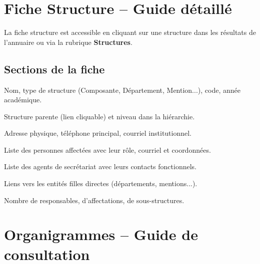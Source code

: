 
\section{Fiche Structure -- Guide d\'etaill\'e}
\label{sec:fiche_structure}

La fiche structure est accessible en cliquant sur une structure dans les r\'esultats de l'annuaire ou via la rubrique \textbf{Structures}.

\subsection{Sections de la fiche}

\begin{description}[style=nextline, font=\bfseries]
  \item[Identification] Nom, type de structure (Composante, D\'epartement, Mention...), code, ann\'ee acad\'emique.
  \item[Hi\'erarchie] Structure parente (lien cliquable) et niveau dans la hi\'erarchie.
  \item[Coordonn\'ees] Adresse physique, t\'el\'ephone principal, courriel institutionnel.
  \item[Responsables] Liste des personnes affect\'ees avec leur r\^ole, courriel et coordonn\'ees.
  \item[Secr\'etariat] Liste des agents de secr\'etariat avec leurs contacts fonctionnels.
  \item[Sous-structures] Liens vers les entit\'es filles directes (d\'epartements, mentions...).
  \item[Statistiques] Nombre de responsables, d'affectations, de sous-structures.
\end{description}


\section{Organigrammes -- Guide de consultation}
\label{sec:organigrammes_consultation}

